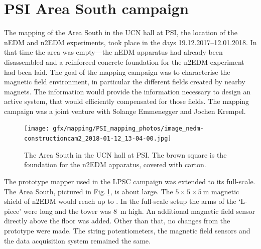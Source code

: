 \section{PSI Area South campaign}
The mapping of the Area South in the UCN hall at PSI, the location of the nEDM and n2EDM experiments, took place in the days 19.12.2017--12.01.2018. In that time the area was empty---the nEDM apparatus had already been disassembled and a reinforced concrete foundation for the n2EDM experiment had been laid.
The goal of the mapping campaign was to characterise the magnetic field environment, in particular the different fields created by nearby magnets.
The information would provide the information necessary to design an active system, that would efficiently compensated for those fields.
The mapping campaign was a joint venture with Solange Emmenegger and Jochen Krempel.

\begin{figure}
  \centering
  \texttt{[image: gfx/mapping/PSI\_mapping\_photos/image\_nedm-constructioncam2\_2018-01-12\_13-04-00.jpg]}
  \caption{The Area South in the UCN hall at PSI\@. The brown square is the foundation for the n2EDM apparatus, covered with carton. }\label{fig:mapping_photo}
\end{figure}

The prototype mapper used in the LPSC campaign was extended to its full-scale. The Area South, pictured in Fig.\,\ref{fig:mapping_photo}, is about  large.
The $5 \times 5 \times \SI{5}{\metre}$ magnetic shield of n2EDM would reach up to . In the full-scale setup the arms of the `L-piece' were  long and the tower was \SI{8}{\metre} high.
An additional magnetic field sensor directly above the floor was added. Other than that, no changes from the prototype were made. The string potentiometers, the magnetic field sensors and the data acquisition system remained the same.


